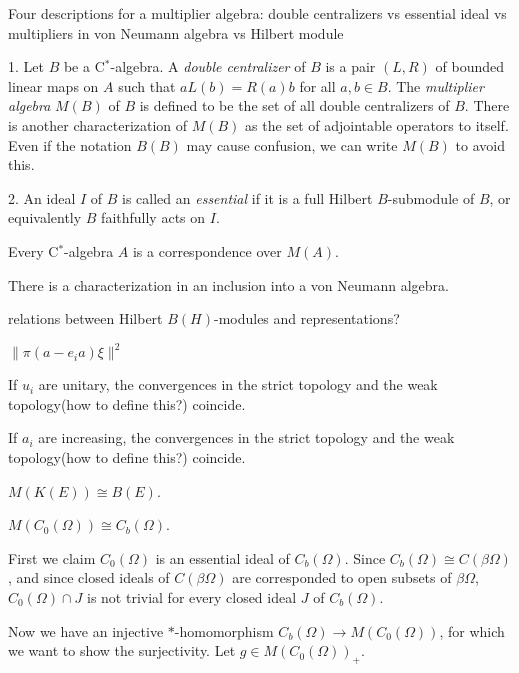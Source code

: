 \documentclass{../../large}
\begin{document}
\begin{prb}
Four descriptions for a multiplier algebra:
double centralizers vs essential ideal vs multipliers in von Neumann algebra vs Hilbert module

1.
Let $B$ be a C$^*$-algebra.
A \emph{double centralizer} of $B$ is a pair $(L,R)$ of bounded linear maps on $A$ such that $aL(b)=R(a)b$ for all $a,b\in B$.
The \emph{multiplier algebra} $M(B)$ of $B$ is defined to be the set of all double centralizers of $B$.
There is another characterization of $M(B)$ as the set of adjointable operators to itself.
Even if the notation $B(B)$ may cause confusion, we can write $M(B)$ to avoid this.

2.
An ideal $I$ of $B$ is called an \emph{essential} if it is a full Hilbert $B$-submodule of $B$, or equivalently $B$ faithfully acts on $I$.



Every C$^*$-algebra $A$ is a correspondence over $M(A)$.

There is a characterization in an inclusion into a von Neumann algebra.

relations between Hilbert $B(H)$-modules and representations?


\begin{parts}
\item $\|\pi(a-e_ia)\xi\|^2$
\item If $u_i$ are unitary, the convergences in the strict topology and the weak topology(how to define this?) coincide.
\item If $a_i$ are increasing, the convergences in the strict topology and the weak topology(how to define this?) coincide.
\item $M(K(E))\cong B(E)$.
\item $M(C_0(\Omega))\cong C_b(\Omega)$.
\end{parts}
\end{prb}
\begin{pf}
First we claim $C_0(\Omega)$ is an essential ideal of $C_b(\Omega)$.
Since $C_b(\Omega)\cong C(\beta\Omega)$, and since closed ideals of $C(\beta\Omega)$ are corresponded to open subsets of $\beta\Omega$, $C_0(\Omega)\cap J$ is not trivial for every closed ideal $J$ of $C_b(\Omega)$.

Now we have an injective $*$-homomorphism $C_b(\Omega)\to M(C_0(\Omega))$, for which we want to show the surjectivity.
Let $g\in M(C_0(\Omega))_+$.


\end{pf}
\end{document}
